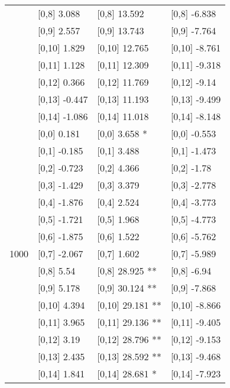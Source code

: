 \begin{table}
\begin{tabular}[t]{llll}
 & {}[0,8] 3.088 & {}[0,8] 13.592 & {}[0,8] -6.838\\
 & {}[0,9] 2.557 & {}[0,9] 13.743 & {}[0,9] -7.764\\
\addlinespace
 & {}[0,10] 1.829 & {}[0,10] 12.765 & {}[0,10] -8.761\\
 & {}[0,11] 1.128 & {}[0,11] 12.309 & {}[0,11] -9.318\\
 & {}[0,12] 0.366 & {}[0,12] 11.769 & {}[0,12] -9.14\\
 & {}[0,13] -0.447 & {}[0,13] 11.193 & {}[0,13] -9.499\\
 & {}[0,14] -1.086 & {}[0,14] 11.018 & {}[0,14] -8.148\\
\addlinespace
 & {}[0,0] 0.181 & {}[0,0] 3.658 * & {}[0,0] -0.553\\
 & {}[0,1] -0.185 & {}[0,1] 3.488 & {}[0,1] -1.473\\
 & {}[0,2] -0.723 & {}[0,2] 4.366 & {}[0,2] -1.78\\
 & {}[0,3] -1.429 & {}[0,3] 3.379 & {}[0,3] -2.778\\
 & {}[0,4] -1.876 & {}[0,4] 2.524 & {}[0,4] -3.773\\
\addlinespace
 & {}[0,5] -1.721 & {}[0,5] 1.968 & {}[0,5] -4.773\\
 & {}[0,6] -1.875 & {}[0,6] 1.522 & {}[0,6] -5.762\\
1000 & {}[0,7] -2.067 & {}[0,7] 1.602 & {}[0,7] -5.989\\
 & {}[0,8] 5.54 & {}[0,8] 28.925 ** & {}[0,8] -6.94\\
 & {}[0,9] 5.178 & {}[0,9] 30.124 ** & {}[0,9] -7.868\\
\addlinespace
 & {}[0,10] 4.394 & {}[0,10] 29.181 ** & {}[0,10] -8.866\\
 & {}[0,11] 3.965 & {}[0,11] 29.136 ** & {}[0,11] -9.405\\
 & {}[0,12] 3.19 & {}[0,12] 28.796 ** & {}[0,12] -9.153\\
 & {}[0,13] 2.435 & {}[0,13] 28.592 ** & {}[0,13] -9.468\\
 & {}[0,14] 1.841 & {}[0,14] 28.681 * & {}[0,14] -7.923\\
\bottomrule
\end{tabular}
\end{table}

